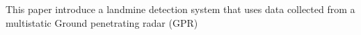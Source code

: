 \documentclass[conference]{IEEEtran}
\begin{document}
This paper introduce a landmine detection system that uses data collected from a multistatic   Ground penetrating radar (GPR)








\end{document}
